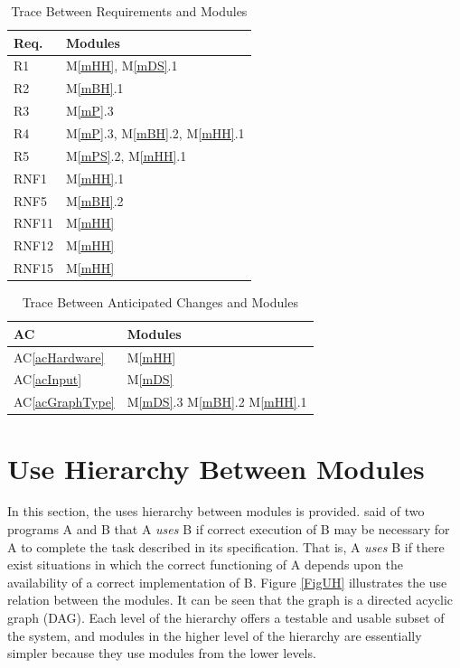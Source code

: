 \documentclass[12pt, titlepage]{article}
\newcommand{\acref}[1]{AC\ref{#1}}
\newcommand{\mref}[1]{M\ref{#1}}
\begin{document}
\begin{table}[H]
\centering
\begin{tabular}{p{} p{}}
\toprule
\textbf{Req.} & \textbf{Modules}\\
\midrule
R1 & \mref{mHH}, \mref{mDS}.1 \\
R2 & \mref{mBH}.1 \\
R3 & \mref{mP}.3\\
R4 & \mref{mP}.3, \mref{mBH}.2, \mref{mHH}.1\\
R5 & \mref{mPS}.2, \mref{mHH}.1 \\
RNF1 & \mref{mHH}.1 \\
RNF5 & \mref{mBH}.2 \\
RNF11 & \mref{mHH}\\
RNF12 & \mref{mHH}\\
RNF15 & \mref{mHH}\\
\bottomrule
\end{tabular}
\caption{Trace Between Requirements and Modules}
\label{TblRT}
\end{table}

\begin{table}[H]
\centering
\begin{tabular}{p{} p{}}
\toprule
\textbf{AC} & \textbf{Modules}\\
\midrule
\acref{acHardware} & \mref{mHH}\\
\acref{acInput} & \mref{mDS}\\
\acref{acGraphType} & \mref{mDS}.3 \mref{mBH}.2 \mref{mHH}.1\\
\bottomrule
\end{tabular}
\caption{Trace Between Anticipated Changes and Modules}
\label{TblACT}
\end{table}

\section{Use Hierarchy Between Modules} \label{SecUse}%

In this section, the uses hierarchy between modules is
provided. \citet{Parnas1978} said of two programs A and B that A {\em uses} B if
correct execution of B may be necessary for A to complete the task described in
its specification. That is, A {\em uses} B if there exist situations in which
the correct functioning of A depends upon the availability of a correct
implementation of B.  Figure \ref{FigUH} illustrates the use relation between
the modules. It can be seen that the graph is a directed acyclic graph
(DAG). Each level of the hierarchy offers a testable and usable subset of the
system, and modules in the higher level of the hierarchy are essentially simpler
because they use modules from the lower levels.
\end{document}
